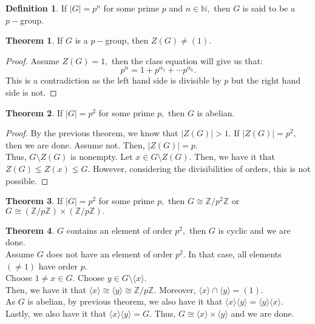 \documentclass[12 pt, a4paper, toc=graduated, oneside]{article}
\theoremstyle{definition}
\newtheorem{defn}{Definition}
\newtheorem{theorem}{Theorem}
\begin{document}
\begin{defn}
	If $|G| = p^n$ for some prime $p$ and $n \in \mathbb{N},$ then $G$ is said to be a $p-$group.
\end{defn}
\begin{theorem}
	If $G$ is a $p-$group, then $Z(G) \neq (1).$
\end{theorem}
\begin{proof}
	Assume $Z(G) = 1,$ then the class equation will give us that:
	\[p^n = 1 + p^{\alpha_1} + \cdots p^{\alpha_k}.\]
	This is a contradiction as the left hand side is divisible by $p$ but the right hand side is not.
\end{proof}
\begin{theorem}
	If $|G| = p^2$ for some prime $p,$ then $G$ is abelian.
\end{theorem}
\begin{proof}
	By the previous theorem, we know that $|Z(G)| > 1.$ If $|Z(G)| = p^2,$ then we are done. Assume not. Then, $|Z(G)| = p.$\\
	Thus, $G \setminus Z(G)$ is nonempty. Let $x \in G\setminus Z(G).$ Then, we have it that $Z(G) \lneq Z(x) \lneq G.$ However, considering the divisibilities of orders, this is not possible.
\end{proof}
\begin{theorem}
	If $|G| = p^2$ for some prime $p,$ then $G \cong \mathbb{Z}/p^2\mathbb{Z}$ or $G \cong (\mathbb{Z}/p\mathbb{Z})\times (\mathbb{Z}/p\mathbb{Z}).$
\end{theorem}
\begin{theorem}
	$G$ contains an element of order $p^2,$ then $G$ is cyclic and we are done.\\
	Assume $G$ does not have an element of order $p^2.$ In that case, all elements $(\neq1)$ have order $p.$\\
	Choose $1 \neq x \in G.$ Choose $y \in G \setminus \langle x\rangle.$\\
	Then, we have it that $\langle x\rangle \cong \langle y\rangle \cong \mathbb{Z}/p\mathbb{Z}.$ Moreover, $\langle x\rangle \cap \langle y\rangle = (1).$\\
	As $G$ is abelian, by previous theorem, we also have it that $\langle x\rangle \langle y\rangle = \langle y\rangle\langle x\rangle .$\\
	Lastly, we also have it that $\langle x\rangle\langle y\rangle = G.$ Thus, $G \cong \langle x\rangle\times\langle y\rangle$ and we are done.
\end{theorem}
\end{document}
